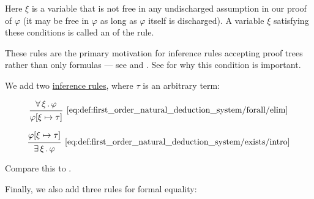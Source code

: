 \begin{definition}
\begin{thmenum}
    Here \( \xi \) is a variable that is not free in any undischarged assumption in our proof of \( \varphi \) (it may be free in \( \varphi \) as long as \( \varphi \) itself is discharged). A variable \( \xi \) satisfying these conditions is called an  of the rule.

    These rules are the primary motivation for inference rules accepting proof trees rather than only formulas --- see  and . See  for why this condition is important.

     We add two \hyperref[def:judgment/inference_rule]{inference rules}, where \( \tau \) is an arbitrary term:

    \begin{minipage}{0.45\textwidth}
      \begin{equation*}\taglabel[\( \forall^- \)]{eq:def:first_order_natural_deduction_system/forall/elim}
        \begin{prooftree}
          \hypo{ \qforall \xi \varphi }
          \infer1[\ref{eq:def:first_order_natural_deduction_system/forall/elim}]{ \varphi[\xi \mapsto \tau] }
        \end{prooftree}
      \end{equation*}
    \end{minipage}
    \hfill
    \begin{minipage}{0.45\textwidth}
      \begin{equation*}\taglabel[\( \exists^+ \)]{eq:def:first_order_natural_deduction_system/exists/intro}
        \begin{prooftree}
          \hypo{ \varphi[\xi \mapsto \tau] }
          \infer1[\ref{eq:def:first_order_natural_deduction_system/exists/intro}]{ \qexists \xi \varphi }
        \end{prooftree}
      \end{equation*}
    \end{minipage}

    Compare this to .

     Finally, we also add three rules for formal equality:


\end{thmenum}
\end{definition}
